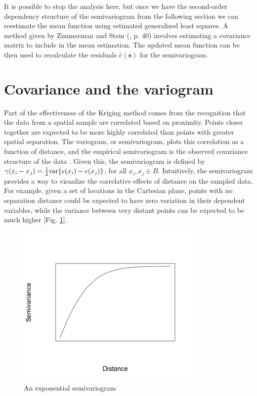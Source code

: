 \documentclass[12pt,twoside]{reedthesis}
\begin{document}
It is possible to stop the analysis here, but once we have the second-order dependency structure of the semivariogram from the following section we can reestimate the mean function using estimated generalized least squares. A method given by Zimmerman and Stein (\cite{gelfand:2010}, p. 40) involves estimating a covariance matrix to include in the mean estimation. The updated mean function can be then used to recalculate the residuals $\hat e(\mathbf{s})$ for the semivariogram.


\section{Covariance and the variogram}
Part of the effectiveness of the Kriging method comes from the recognition that the data from a spatial sample are correlated based on proximity. Points closer together are expected to be more highly correlated than points with greater spatial separation. The variogram, or semivariogram, plots this correlation as a function of distance, and the empirical semivariogram is the observed covariance structure of the data \cite{gelfand:2010}. Given this, the semivariogram is defined by $\gamma(x_i - x_j) = {1\over 2} \text{var} \{ e(x_i) - e(x_j) \}$, for all $x_i, x_j \in B$. Intuitively, the semivariogram provides a way to visualize the correlative effects of distance on the sampled data. For example, given a set of locations in the Cartesian plane, points with no separation distance could be expected to have zero variation in their dependent variables, while the variance between very distant points can be expected to be much higher [Fig. \ref{fig:semivariogram}]. \\

\begin{figure}[h]
    \centering
    \includegraphics[width=0.8\textwidth]{semivariogram}
    \caption{An exponential semivariogram}
    \label{fig:semivariogram}
\end{figure}
\end{document}
